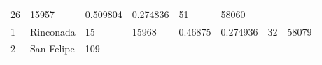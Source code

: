 \documentclass[]{article}
\begin{document}
\begin{longtable}[]{@{}llllllll@{}}
\begin{minipage}[t]{0.14\columnwidth}
26\strut
\end{minipage} & \begin{minipage}[t]{0.13\columnwidth}\raggedright
15957\strut
\end{minipage} & \begin{minipage}[t]{0.10\columnwidth}\raggedright
0.509804\strut
\end{minipage} & \begin{minipage}[t]{0.09\columnwidth}\raggedright
0.274836\strut
\end{minipage} & \begin{minipage}[t]{0.11\columnwidth}\raggedright
51\strut
\end{minipage} & \begin{minipage}[t]{0.10\columnwidth}\raggedright
58060\strut
\end{minipage}\tabularnewline
\begin{minipage}[t]{0.03\columnwidth}\raggedright
1\strut
\end{minipage} & \begin{minipage}[t]{0.09\columnwidth}\raggedright
Rinconada\strut
\end{minipage} & \begin{minipage}[t]{0.14\columnwidth}\raggedright
15\strut
\end{minipage} & \begin{minipage}[t]{0.13\columnwidth}\raggedright
15968\strut
\end{minipage} & \begin{minipage}[t]{0.10\columnwidth}\raggedright
0.46875\strut
\end{minipage} & \begin{minipage}[t]{0.09\columnwidth}\raggedright
0.274936\strut
\end{minipage} & \begin{minipage}[t]{0.11\columnwidth}\raggedright
32\strut
\end{minipage} & \begin{minipage}[t]{0.10\columnwidth}\raggedright
58079\strut
\end{minipage}\tabularnewline
\begin{minipage}[t]{0.03\columnwidth}\raggedright
2\strut
\end{minipage} & \begin{minipage}[t]{0.09\columnwidth}\raggedright
San Felipe\strut
\end{minipage} & \begin{minipage}[t]{0.14\columnwidth}\raggedright
109\strut
\end{minipage} & \begin{minipage}[t]{0.13\columnwidth}\raggedright

\end{minipage}
\end{longtable}
\end{document}
